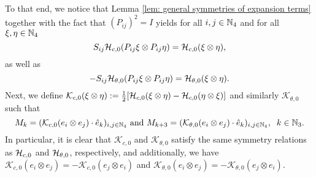 To that end, we notice that Lemma \ref{lem: general symmetries of expansion terms} together with the fact that $(P_{ij})^2 = I$ yields for all $i,j \in \mathbb{N}_4$ and for all $\xi, \eta \in \mathbb{N}_4$
\begin{equation}
	S_{ij} \mathcal{H}_{c,0}(P_{ij} \xi \otimes P_{ij} \eta) = \mathcal{H}_{c,0}(\xi \otimes \eta),
\end{equation}
as well as
\begin{equation}
	-S_{ij} \mathcal{H}_{\theta,0}(P_{ij} \xi \otimes P_{ij} \eta) = \mathcal{H}_{\theta, 0}(\xi \otimes \eta).
\end{equation}
Next, we define $\mathcal{K}_{c,0}(\xi \otimes \eta) := \tfrac{1}{2}[\mathcal{H}_{c,0}(\xi \otimes \eta) - \mathcal{H}_{c,0}(\eta \otimes \xi)]$ and similarly $\mathcal{K}_{\theta,0}$ such that
\begin{equation}
	M_k = (\mathcal{K}_{c,0}(e_i \otimes e_j) \cdot \hat{e}_k)_{i,j \in \mathbb{N}_4} \text{ and } M_{k + 3} = (\mathcal{K}_{\theta,0}(e_i \otimes e_j) \cdot \hat{e}_k)_{i,j \in \mathbb{N}_4},\;\; k \in \mathbb{N}_3.
\end{equation} 
In particular, it is clear that $\mathcal{K}_{c,0}$ and $\mathcal{K}_{\theta,0}$ satisfy the same symmetry relations as $\mathcal{H}_{c,0}$ and $\mathcal{H}_{\theta, 0}$, respectively, and additionally, we have $\mathcal{K}_{c,0}(e_i \otimes e_j) = - \mathcal{K}_{c,0}(e_j \otimes e_i)$ and $\mathcal{K}_{\theta,0}(e_i \otimes e_j) = - \mathcal{K}_{\theta,0}(e_j \otimes e_i)$.

